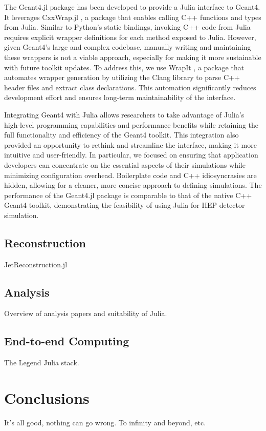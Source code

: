 \documentclass{webofc}
\begin{document}
The Geant4.jl \cite{geant4-jl-github} package has been developed to provide a Julia interface to Geant4. It leverages CxxWrap.jl \cite{cxxwrap-jl-github}, a package that enables calling C++ functions and types from Julia. Similar to Python’s static bindings, invoking C++ code from Julia requires explicit wrapper definitions for each method exposed to Julia. However, given Geant4's large and complex codebase, manually writing and maintaining these wrappers is not a viable approach, especially for making it more sustainable with future toolkit updates. To address this, we use WrapIt \cite{wrapit-github}, a package that automates wrapper generation by utilizing the Clang library to parse C++ header files and extract class declarations. This automation significantly reduces development effort and ensures long-term maintainability of the interface.

Integrating Geant4 with Julia allows researchers to take advantage of Julia's high-level programming capabilities and performance benefits while retaining the full functionality and efficiency of the Geant4 toolkit. This integration also provided an opportunity to rethink and streamline the interface, making it more intuitive and user-friendly. In particular, we focused on ensuring that application developers can concentrate on the essential aspects of their simulations while minimizing configuration overhead. Boilerplate code and C++ idiosyncrasies are hidden, allowing for a cleaner, more concise approach to defining simulations. The performance of the Geant4.jl package is comparable to that of the native C++ Geant4 toolkit, demonstrating the feasibility of using Julia for HEP detector simulation.

\subsection{Reconstruction}

JetReconstruction.jl

\subsection{Analysis}

Overview of analysis papers and suitability of Julia.

\subsection{End-to-end Computing}

The Legend Julia stack.

\section{Conclusions}

It's all good, nothing can go wrong. To infinity and beyond, etc.

\sloppy
\raggedright

\end{document}
